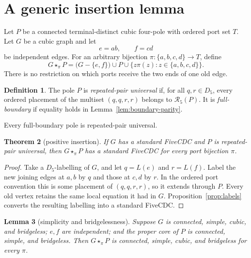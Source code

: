 \documentclass[11pt]{article}
\newtheorem{theorem}{Theorem}[section]
\newtheorem{lemma}[theorem]{Lemma}
\theoremstyle{definition}
\newtheorem{definition}[theorem]{Definition}
\theoremstyle{remark}
\newcommand{\Dfive}{D_5}
\begin{document}
\section{A generic insertion lemma}

Let \(P\) be a connected terminal-distinct cubic four-pole with ordered
port set \(T\).  Let \(G\) be a cubic graph and let
\[
                         e=ab,\qquad f=cd
\]
be independent edges.  For an arbitrary bijection
\(\pi:\{a,b,c,d\}\to T\), define
\[
        G\star_{\pi}P
        =\bigl(G-\{e,f\}\bigr)\cup P
          \cup\{z\pi(z):z\in\{a,b,c,d\}\}.              \tag{3.1}
\]
There is no restriction on which ports receive the two ends of one old
edge.

\begin{definition}
The pole \(P\) is \emph{repeated-pair universal} if, for all
\(q,r\in\Dfive\), every ordered placement of the multiset
\((q,q,r,r)\) belongs to \(\mathcal R_5(P)\).  It is
\emph{full-boundary} if equality holds in Lemma~\ref{lem:boundary-parity}.
\end{definition}

Every full-boundary pole is repeated-pair universal.

\begin{theorem}[positive insertion]\label{thm:insertion}
If \(G\) has a standard FiveCDC and \(P\) is repeated-pair universal, then
\(G\star_\pi P\) has a standard FiveCDC for every port bijection \(\pi\).
\end{theorem}

\begin{proof}
Take a \(\Dfive\)-labelling of \(G\), and let \(q=L(e)\) and \(r=L(f)\).
Label the new joining edges at \(a,b\) by \(q\) and those at \(c,d\) by
\(r\).  In the ordered port convention this is some placement of
\((q,q,r,r)\), so it extends through \(P\).  Every old vertex retains
the same local equation it had in \(G\).  Proposition~\ref{prop:labels}
converts the resulting labelling into a standard FiveCDC.
\end{proof}

\begin{lemma}[simplicity and bridgelessness]\label{lem:bridgeless}
Suppose \(G\) is connected, simple, cubic, and bridgeless; \(e,f\) are
independent; and the proper core of \(P\) is connected, simple, and
bridgeless.  Then \(G\star_\pi P\) is connected, simple, cubic, and
bridgeless for every \(\pi\).
\end{lemma}
\end{document}
